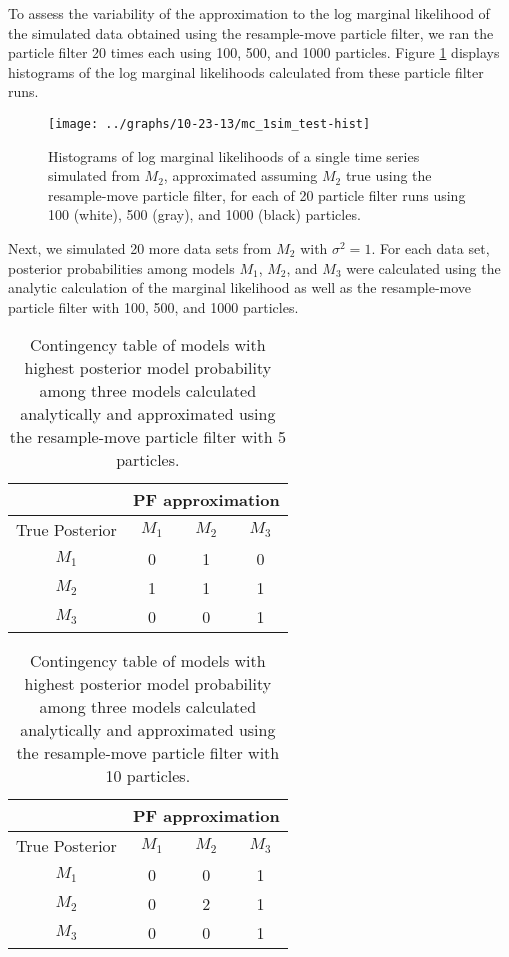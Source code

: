 \documentclass{article}
\begin{document}
To assess the variability of the approximation to the log marginal likelihood of the simulated data obtained using the resample-move particle filter, we ran the particle filter 20 times each using 100, 500, and 1000 particles. Figure \ref{fig:pf-hist} displays histograms of the log marginal likelihoods calculated from these particle filter runs.

\begin{figure}
\texttt{[image: ../graphs/10-23-13/mc\_1sim\_test-hist]}
\caption{Histograms of log marginal likelihoods of a single time series simulated from $M_2$, approximated assuming $M_2$ true using the resample-move particle filter, for each of 20 particle filter runs using 100 (white), 500 (gray), and 1000 (black) particles.} \label{fig:pf-hist}
\end{figure}

Next, we simulated 20 more data sets from $M_2$ with $\sigma^2 = 1$. For each data set, posterior probabilities among models $M_1$, $M_2$, and $M_3$ were calculated using the analytic calculation of the marginal likelihood as well as the resample-move particle filter with 100, 500, and 1000 particles.

\begin{table}
\begin{center}
\caption{Contingency table of models with highest posterior model probability among three models calculated analytically and approximated using the resample-move particle filter with 5 particles.} \label{tab:cont-tab5}
\begin{tabular}{|c|c|c|c|}
\hline
 & \multicolumn{3}{|c|}{PF approximation} \\
 \hline
 True Posterior & $M_1$& $M_2$ & $M_3$ \\
 \hline
$M_1$ &   0 &   1 &   0 \\
\hline
$M_2$ &   1 &   1 &   1 \\
\hline
$M_3$ &   0 &   0 &   1 \\
 \hline
\end{tabular}
\end{center}
\end{table}

\begin{table}
\begin{center}
\caption{Contingency table of models with highest posterior model probability among three models calculated analytically and approximated using the resample-move particle filter with 10 particles.} \label{tab:cont-tab10}
\begin{tabular}{|c|c|c|c|}
\hline
 & \multicolumn{3}{|c|}{PF approximation} \\
 \hline
 True Posterior & $M_1$& $M_2$ & $M_3$ \\
 \hline
$M_1$ &  0  &  0  &  1 \\
\hline
$M_2$ &  0  &  2  &  1 \\
\hline
$M_3$ &  0  &  0  &  1 \\ 
 \hline
\end{tabular}
\end{center}
\end{table}
\end{document}
